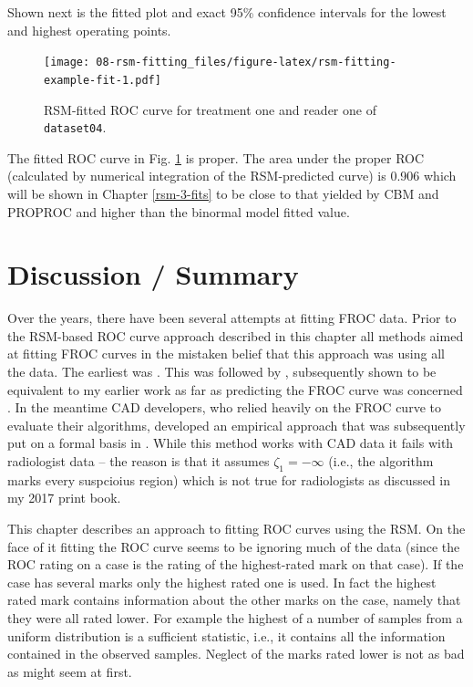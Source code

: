 \documentclass[
]{book}
\begin{document}
Shown next is the fitted plot and exact 95\% confidence intervals for the lowest and highest operating points.

\begin{figure}
\centering
\texttt{[image: 08-rsm-fitting\_files/figure-latex/rsm-fitting-example-fit-1.pdf]}
\caption{\label{fig:rsm-fitting-example-fit}RSM-fitted ROC curve for treatment one and reader one of \texttt{dataset04}.}
\end{figure}

The fitted ROC curve in Fig. \ref{fig:rsm-fitting-example-fit} is proper. The area under the proper ROC (calculated by numerical integration of the RSM-predicted curve) is 0.906 which will be shown in Chapter \ref{rsm-3-fits} to be close to that yielded by CBM and PROPROC and higher than the binormal model fitted value.

\hypertarget{rsm-fitting-discussion-summary}{%
\section{Discussion / Summary}\label{rsm-fitting-discussion-summary}}

Over the years, there have been several attempts at fitting FROC data. Prior to the RSM-based ROC curve approach described in this chapter all methods aimed at fitting FROC curves in the mistaken belief that this approach was using all the data. The earliest was \citep{chakraborty1989maximum}. This was followed by \citep{swensson1996unified}, subsequently shown to be equivalent to my earlier work as far as predicting the FROC curve was concerned \citep{chakraborty2008operating}. In the meantime CAD developers, who relied heavily on the FROC curve to evaluate their algorithms, developed an empirical approach that was subsequently put on a formal basis in \citep{edwards2002maximum}. While this method works with CAD data it fails with radiologist data -- the reason is that it assumes \(\zeta_1 = -\infty\) (i.e., the algorithm marks every suspcioius region) which is not true for radiologists as discussed in my 2017 print book.

This chapter describes an approach to fitting ROC curves using the RSM. On the face of it fitting the ROC curve seems to be ignoring much of the data (since the ROC rating on a case is the rating of the highest-rated mark on that case). If the case has several marks only the highest rated one is used. In fact the highest rated mark contains information about the other marks on the case, namely that they were all rated lower. For example the highest of a number of samples from a uniform distribution is a sufficient statistic, i.e., it contains all the information contained in the observed samples. Neglect of the marks rated lower is not as bad as might seem at first.
\end{document}
